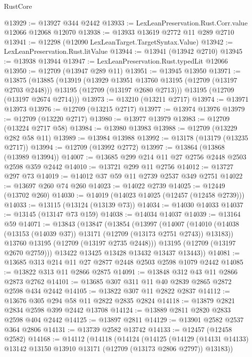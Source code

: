 \begin{lexlean}{RustCore}
\begin{coremodule}
@13929 := @13927 @344 @2442
@13933 := LexLeanPreservation.Rust.Corr.value @12066 @12068 @12070
@13938 := @13933 @13619 @2772 @11 @289 @2710
@13941 := @12298 (@12090 LexLeanTarget.TargetSyntax.Value)
@13942 := LexLeanPreservation.Rust.litValue
@13944 := @13941 (@13942 @2710)
@13945 := @13938 @13944
@13947 := LexLeanPreservation.Rust.typedLit @12066
@13950 := @12709 (@13947 @289 @11)
@13951 := @13945 @13950
@13971 := @13875
    (@13885
      (@13919
        (@13929 @13951 @13760 @13195 (@12709 (@13197 @2703 @2448)))
        @13195
        (@12709 (@13197 @2680 @2713)))
      @13195
      (@12709 (@13197 @2674 @2714)))
@13973 := @13210 (@13211 @2717)
@13974 := @13971 @13973
@13976 := @12709 (@13215 @2717)
@13977 := @13974 @13976
@13979 := @12709 (@13220 @2717)
@13980 := @13977 @13979
@13983 := @12709 (@13224 @2717 @58)
@13984 := @13980 @13983
@13988 := @12709 (@13229 @282 @58 @11)
@13989 := @13984 @13988
@13992 := @13178 (@13179 (@13235 @2717))
@13994 := @12709 (@13992 @2772)
@13997 := @13864 (@13868 (@13989 @13994))
@14007 := @13685 @299 @214 @11 @27 @2756 @2448 @2503 @2598 @359 @2442
@14010 := @13721 @299 @11 @2756
@14012 := @13727 @297 @73
@14019 := @14012 @37 @59 @11 @2739 @2537 @349 @2751
@14022 := @13697 @260 @74 @260
@14023 := @14022 @2739
@14025 := @12449 (@13702 @260)
@14030 := @14019 (@14023 @14025 (@12457 (@12458 @2739)))
@14033 := @13115 (@13124 (@13139 @73))
@14034 := @14030 @14033
@14037 := @13145 (@13147 @73 @159)
@14038 := @14034 @14037
@14039 := @13164 @59
@14071 := @13843
    (@13847
      (@13854
        (@13997
          (@14007
            (@14010 (@14038 (@13153 (@14039 @37)) @13171 (@12709 (@13173 @2751 @2743)) @13183))
            @13760
            @13195
            (@12709 (@13197 @2735 @2448)))
          @13195
          (@12709 (@13197 @2670 @2759)))
        @13422
        @13425
        @13428
        @13432
        @13437
        @13443))
@14081 := @13685 @313 @214 @11 @27 @2877 @2448 @2503 @2598 @1079 @2442
@14085 := @13822 @313 @11 @2866 @2875
@14091 := @13848 @312 @43 @11 @2866 @2873 @2762
@14101 := @13685 @307 @311 @11 @40 @2839 @2865 @2872 @2598 @434 @2442
@14105 := @13822 @307 @11 @2822 @2837
@14112 := @13676 @305 @294 @58 @11 @2822 @2835 @2824
@14118 := @13879 @2821 @2834 @2598 @399 @2442 @13708
@14124 := @13889 @2811 @2820 @2833 @2598 @404 @2442
@14125 := @13897 @2811
@14129 := @13901 @2582 @2537 @364 @2806
@14131 := @13739 @2582 @13742
@14133 := @12457 (@12458 @2582)
@14168 := @14112
    (@14118
      (@14124
        (@14125
          (@14129 (@14131 @14133) @13142 @13150 @13910 @13171 (@12709 (@13173 @2806 @2797)) @13183))

\end{coremodule}
\end{lexlean}

